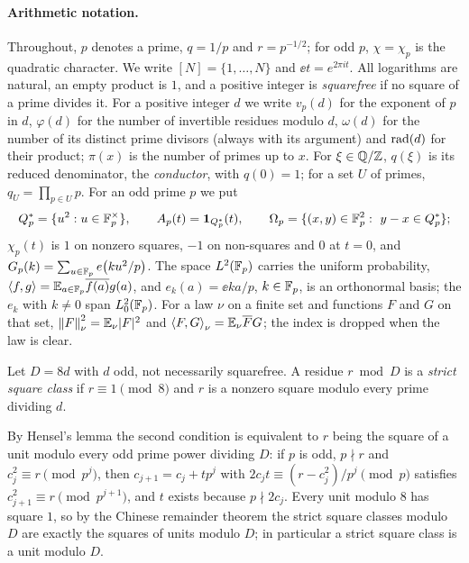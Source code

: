 \paragraph{Arithmetic notation.}
Throughout, $p$ denotes a prime, $q=1/p$ and $r=p^{-1/2}$; for odd $p$,
$\chi=\chi_p$ is the quadratic character. We write $[N]=\{1,\dots,N\}$ and
$\ee t=e^{2\pi it}$. All logarithms are natural, an empty product is $1$, and
a positive integer is \emph{squarefree} if no square of a prime divides it.
For a positive integer $d$ we write $v_p(d)$ for the exponent of $p$ in $d$,
$\varphi(d)$ for the number of invertible residues modulo $d$, $\omega(d)$ for
the number of its distinct prime divisors (always with its argument) and
$\operatorname{rad}(d)$ for their product; $\pi(x)$ is the number of primes up to $x$. For
$\xi\in\mathbb Q/\mathbb Z$, $q(\xi)$ is its reduced denominator, the \emph{conductor}, with
$q(0)=1$; for a set $U$ of primes, $q_U=\prod_{p\in U}p$. For an odd prime $p$
we put
\[
  Q_{p}^{*}=\{u^2:u\in\mathbb F_p^\times\},\qquad A_{p}(t)=\mathbf 1_{Q_{p}^{*}}(t),\qquad
  \Omega_{p}=\{(x,y)\in\mathbb F_p^2:\ y-x\in Q_{p}^{*}\};
\]
$\chi_p(t)$ is $1$ on nonzero squares, $-1$ on non-squares and $0$ at $t=0$,
and $G_p(k)=\sum_{u\in\mathbb F_p}e\!\left(ku^2/p\right)$. The space $L^2(\mathbb F_p)$ carries the
uniform probability, $\left\langle f,g\right\rangle=\mathbb E_{a\in\mathbb F_p}\overline{f(a)}g(a)$, and
$e_k(a)=\ee{ka/p}$, $k\in\mathbb F_p$, is an orthonormal basis; the $e_k$ with
$k\ne0$ span $L^2_0(\mathbb F_p)$. For a law $\nu$ on a finite set and functions $F$ and $G$ on that set,
$\left\|F\right\|_\nu^2=\mathbb E_\nu|F|^2$ and $\left\langle F,G\right\rangle_\nu=\mathbb E_\nu\overline FG$; the index is
dropped when the law is clear.

\begin{definition}\label{def:strict-square-class}
Let $D=8d$ with $d$ odd, not necessarily squarefree. A residue $r\bmod D$ is a
\emph{strict square class} if $r\equiv1\pmod8$ and $r$ is a nonzero square
modulo every prime dividing $d$.
\end{definition}

By Hensel's lemma the second condition is equivalent to $r$ being the square
of a unit modulo every odd prime power dividing $D$: if $p$ is odd, $p\nmid r$ and $c_j^2\equiv
r\pmod{p^j}$, then $c_{j+1}=c_j+tp^j$ with $2c_jt\equiv(r-c_j^2)/p^j\pmod p$
satisfies $c_{j+1}^2\equiv r\pmod{p^{j+1}}$, and $t$ exists because
$p\nmid2c_j$. Every unit modulo $8$ has square $1$, so by the Chinese remainder
theorem the strict square classes modulo $D$ are exactly the squares of units
modulo $D$; in particular a strict square class is a unit modulo $D$.

